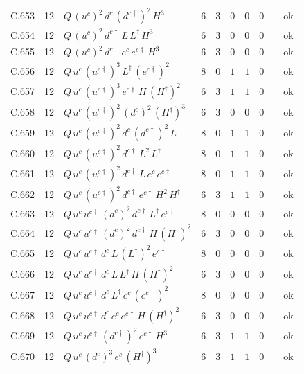 {\begin{longtable}{@{}ll>{\raggedright\arraybackslash}p{6.4cm}rrllllr@{}}
C.653 & 12 & $Q\,(u^c)^{2}\,d^c\,(d^{c\dagger})^{2}\,H^{3}$ & 6 & 3 & $0$ & $0$ & $0$ &  & ok \\
C.654 & 12 & $Q\,(u^c)^{2}\,d^{c\dagger}\,L\,L^\dagger\,H^{3}$ & 6 & 3 & $0$ & $0$ & $0$ &  & ok \\
C.655 & 12 & $Q\,(u^c)^{2}\,d^{c\dagger}\,e^c\,e^{c\dagger}\,H^{3}$ & 6 & 3 & $0$ & $0$ & $0$ &  & ok \\
C.656 & 12 & $Q\,u^c\,(u^{c\dagger})^{3}\,L^\dagger\,(e^{c\dagger})^{2}$ & 8 & 0 & $1$ & $1$ & $0$ &  & ok \\
C.657 & 12 & $Q\,u^c\,(u^{c\dagger})^{3}\,e^{c\dagger}\,H\,(H^\dagger)^{2}$ & 6 & 3 & $1$ & $1$ & $0$ &  & ok \\
C.658 & 12 & $Q\,u^c\,(u^{c\dagger})^{2}\,(d^c)^{2}\,(H^\dagger)^{3}$ & 6 & 3 & $0$ & $0$ & $0$ &  & ok \\
C.659 & 12 & $Q\,u^c\,(u^{c\dagger})^{2}\,d^c\,(d^{c\dagger})^{2}\,L$ & 8 & 0 & $1$ & $1$ & $0$ &  & ok \\
C.660 & 12 & $Q\,u^c\,(u^{c\dagger})^{2}\,d^{c\dagger}\,L^{2}\,L^\dagger$ & 8 & 0 & $1$ & $1$ & $0$ &  & ok \\
C.661 & 12 & $Q\,u^c\,(u^{c\dagger})^{2}\,d^{c\dagger}\,L\,e^c\,e^{c\dagger}$ & 8 & 0 & $1$ & $1$ & $0$ &  & ok \\
C.662 & 12 & $Q\,u^c\,(u^{c\dagger})^{2}\,d^{c\dagger}\,e^{c\dagger}\,H^{2}\,H^\dagger$ & 6 & 3 & $1$ & $1$ & $0$ &  & ok \\
C.663 & 12 & $Q\,u^c\,u^{c\dagger}\,(d^c)^{2}\,d^{c\dagger}\,L^\dagger\,e^{c\dagger}$ & 8 & 0 & $0$ & $0$ & $0$ &  & ok \\
C.664 & 12 & $Q\,u^c\,u^{c\dagger}\,(d^c)^{2}\,d^{c\dagger}\,H\,(H^\dagger)^{2}$ & 6 & 3 & $0$ & $0$ & $0$ &  & ok \\
C.665 & 12 & $Q\,u^c\,u^{c\dagger}\,d^c\,L\,(L^\dagger)^{2}\,e^{c\dagger}$ & 8 & 0 & $0$ & $0$ & $0$ &  & ok \\
C.666 & 12 & $Q\,u^c\,u^{c\dagger}\,d^c\,L\,L^\dagger\,H\,(H^\dagger)^{2}$ & 6 & 3 & $0$ & $0$ & $0$ &  & ok \\
C.667 & 12 & $Q\,u^c\,u^{c\dagger}\,d^c\,L^\dagger\,e^c\,(e^{c\dagger})^{2}$ & 8 & 0 & $0$ & $0$ & $0$ &  & ok \\
C.668 & 12 & $Q\,u^c\,u^{c\dagger}\,d^c\,e^c\,e^{c\dagger}\,H\,(H^\dagger)^{2}$ & 6 & 3 & $0$ & $0$ & $0$ &  & ok \\
C.669 & 12 & $Q\,u^c\,u^{c\dagger}\,(d^{c\dagger})^{2}\,e^{c\dagger}\,H^{3}$ & 6 & 3 & $1$ & $1$ & $0$ &  & ok \\
C.670 & 12 & $Q\,u^c\,(d^c)^{3}\,e^c\,(H^\dagger)^{3}$ & 6 & 3 & $1$ & $1$ & $0$ &  & ok \\

\end{longtable}}
